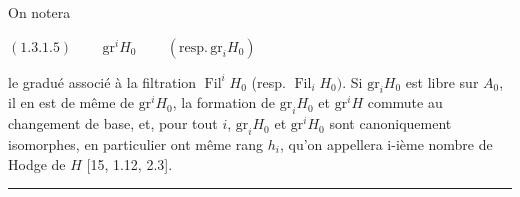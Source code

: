 \documentclass[9pt]{article}
\newcommand{\CanonText}[1]{\par{\fontsize{8.0}{9.35}\selectfont\RaggedRight #1\par}\vspace{2.2pt}}
\newcommand{\CanonDisplay}[1]{\par\vspace{1.2pt}\begin{center}{\fontsize{7.2}{8.4}\selectfont\(\displaystyle #1\)}\end{center}\vspace{1.2pt}}
\begin{document}
\begin{minipage}[t][\dimexpr\textheight-5pt\relax][t]{\textwidth}
\CanonText{On notera}
\CanonDisplay{(1.3.1.5)\qquad\,\text{gr}^{i}H_{0}\qquad\,(\text{resp}.\,\text{gr}_{i}H_{0})}
\CanonText{le gradué associé à la filtration \(\operatorname{Fil}^{i}H_{0}\) (resp. \(\operatorname{Fil}_{i}H_{0})\). Si \(\text{gr}_{i}H_{0}\) est libre sur \(A_{0}\), il en est de même de \(\text{gr}^{i}H_{0}\), la formation de \(\text{gr}_{i}H_{0}\) et \(\text{gr}^{i}H\) commute au changement de base, et, pour tout \(i\), \(\text{gr}_{i}H_{0}\) et \(\text{gr}^{i}H_{0}\) sont canoniquement isomorphes, en particulier ont même rang \(h_{i}\), qu'on appellera i-ième nombre de Hodge de \(H\) [15, 1.12, 2.3].}
\vfill
{\color{Accent}\hrule height 0.35pt}\vspace{3pt}
\end{minipage}
\newpage
\end{document}
